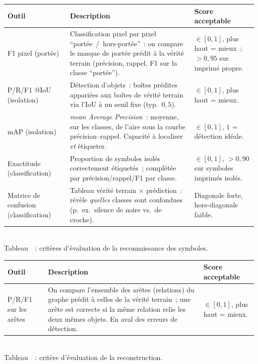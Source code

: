 \documentclass[a4paper,10pt]{article}
\begin{document}
\medskip
\begin{center}
\label{tab:symboles}%
\begin{tabular}{@{}p{3.0cm} p{8.5cm} p{3.4cm}@{}}
\hline
\textbf{Outil} & \textbf{Description} & \textbf{Score acceptable} \\
\hline
F1 pixel (portée)~\cite{dalitz2008,fornes2013grec} & Classification pixel par pixel ``portée~/~hors-portée''~: on compare le masque de portée prédit à la vérité terrain (précision, rappel, F1 sur la classe ``portée''). & $\in[0,1]$, plus haut = mieux~; $>0{,}95$ sur imprimé propre. \\
\hline
P/R/F1 @IoU (isolation) & Détection d'objets~: boîtes prédites appariées aux boîtes de vérité terrain via l'IoU à un seuil fixe (typ.\ $0{,}5$). & $\in[0,1]$, plus haut = mieux. \\
\hline
mAP (isolation) & \emph{mean Average Precision}~: moyenne, sur les classes, de l'aire sous la courbe précision--rappel. Capacité à localiser \emph{et} étiqueter. & $\in[0,1]$, $1$ = détection idéale. \\
\hline
Exactitude (classification)~\cite{rebelo2010} & Proportion de symboles isolés correctement étiquetés~; complétée par précision/rappel/F1 par classe. & $\in[0,1]$, $>0{,}90$ sur symboles imprimés isolés. \\
\hline
Matrice de confusion (classification) & Tableau vérité terrain $\times$ prédiction~: révèle \emph{quelles} classes sont confondues (p.~ex.\ silence de noire vs.\ de croche). & Diagonale forte, hors-diagonale faible. \\
\hline
\end{tabular}\\[3pt]
Tableau~\thetable~: critères d'évaluation de la reconnaissance des symboles.
\end{center}

\medskip
\begin{center}
\label{tab:reconstruction}%
\begin{tabular}{@{}p{3.0cm} p{8.5cm} p{3.4cm}@{}}
\hline
\textbf{Outil} & \textbf{Description} & \textbf{Score acceptable} \\
\hline
P/R/F1 sur les arêtes~\cite{wang2024complete} & On compare l'ensemble des arêtes (relations) du graphe prédit à celles de la vérité terrain~; une arête est correcte si la même relation relie les deux mêmes objets. En aval des erreurs de détection. & $\in[0,1]$, plus haut = mieux. \\
\hline
\end{tabular}\\[3pt]
Tableau~\thetable~: critère d'évaluation de la reconstruction.
\end{center}
\end{document}
